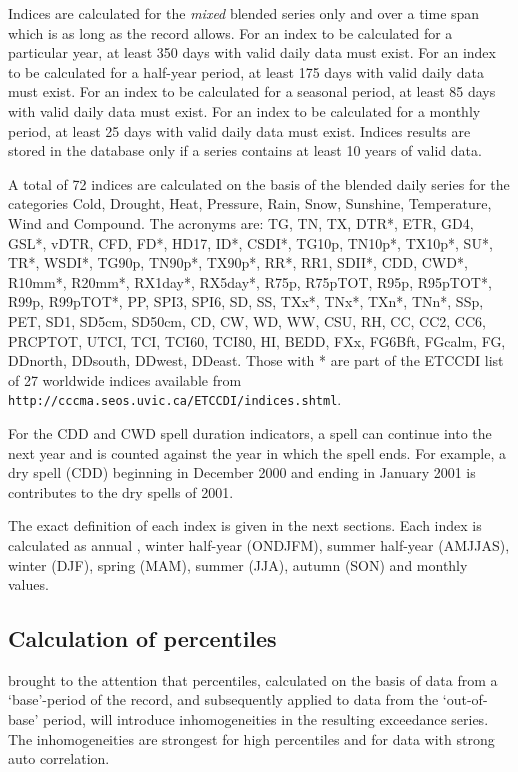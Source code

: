 \documentclass[a4paper,11pt]{article}
\begin{document}
Indices are calculated for the \emph{mixed} blended series only and
over a time span which is as long as the record allows.
For an index to be calculated for a
particular year, at least 350 days with valid daily data must
exist. For an index to be calculated for a half-year period, at least
175 days with valid daily data must exist. For an index to be
calculated for a seasonal period, at least 85 days with valid daily
data must exist. For an index to be
calculated for a monthly period, at least 25 days with valid daily
data must exist. Indices results are stored in the database only if a
series contains at least 10 years of valid data. 

A total of 72 indices are calculated on the basis of the blended daily
series for the categories Cold, Drought, Heat, Pressure, Rain, Snow,
Sunshine, Temperature, Wind and Compound. The acronyms are: 
 TG, TN, TX, DTR*, ETR, GD4, GSL*, vDTR, CFD, FD*, HD17, ID*, CSDI*, TG10p, TN10p*, TX10p*, SU*, TR*,
 WSDI*, TG90p, TN90p*, TX90p*, RR*, RR1, SDII*, CDD, CWD*, R10mm*, R20mm*, RX1day*, RX5day*, R75p, R75pTOT,
 R95p, R95pTOT*, R99p, R99pTOT*, PP, SPI3, SPI6, SD, SS, TXx*, TNx*, TXn*, TNn*, SSp, PET, SD1, SD5cm, SD50cm,
 CD, CW, WD, WW, CSU, RH, CC, CC2, CC6, PRCPTOT, UTCI, TCI, TCI60, TCI80, HI, BEDD,
FXx, FG6Bft, FGcalm, FG, DDnorth, DDsouth, DDwest, DDeast. 
Those with * are part of the ETCCDI list of 27 worldwide indices
available from {\tt http://cccma.seos.uvic.ca/ETCCDI/indices.shtml}.

For the CDD and CWD spell duration indicators, a spell can continue into the next year and is counted against 
the year in which the spell ends. For example, a dry spell (CDD) beginning in December 2000 
and ending in January 2001 is contributes to the dry spells of 2001.


The exact definition of each index is given in the next sections. Each
index is calculated as annual , winter half-year (ONDJFM), summer
half-year (AMJJAS), winter (DJF), spring (MAM), summer (JJA), autumn
(SON) and monthly values.

\subsection{Calculation of percentiles}
\citet{zhang:05} brought to the attention that 
percentiles, calculated on the basis of data from a `base'-period of the record, and subsequently applied
to data from the `out-of-base' period, will introduce inhomogeneities in the resulting exceedance series.
The inhomogeneities are strongest for high percentiles and for data with strong auto correlation.
\end{document}
